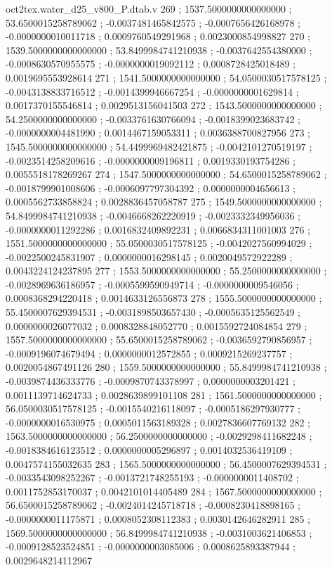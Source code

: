 \begin{filecontents}[overwrite]{oct2tex.water_d25_v800_P.dtab.v}
269 ; 1537.5000000000000000 ; 53.6500015258789062 ; -0.0037481465842575 ; -0.0007656426168978 ; -0.0000000010011718 ; 0.0009760549291968 ; 0.0023000854998827
270 ; 1539.5000000000000000 ; 53.8499984741210938 ; -0.0037642554380000 ; -0.0008630570955575 ; -0.0000000019092112 ; 0.0008728425018489 ; 0.0019695553928614
271 ; 1541.5000000000000000 ; 54.0500030517578125 ; -0.0043138833716512 ; -0.0014399946667254 ; -0.0000000001629814 ; 0.0017370155546814 ; 0.0029513156041503
272 ; 1543.5000000000000000 ; 54.2500000000000000 ; -0.0033761630766094 ; -0.0018399023683742 ; -0.0000000004481990 ; 0.0014467159053311 ; 0.0036388700827956
273 ; 1545.5000000000000000 ; 54.4499969482421875 ; -0.0042101270519197 ; -0.0023514258209616 ; -0.0000000009196811 ; 0.0019330193754286 ; 0.0055518178269267
274 ; 1547.5000000000000000 ; 54.6500015258789062 ; -0.0018799901008606 ; -0.0006097797304392 ; 0.0000000004656613 ; 0.0005562733858824 ; 0.0028836457058787
275 ; 1549.5000000000000000 ; 54.8499984741210938 ; -0.0046668262220919 ; -0.0023332349956036 ; -0.0000000011292286 ; 0.0016832409892231 ; 0.0066834311001003
276 ; 1551.5000000000000000 ; 55.0500030517578125 ; -0.0042027560994029 ; -0.0022500245831907 ; 0.0000000016298145 ; 0.0020049572922289 ; 0.0043224124237895
277 ; 1553.5000000000000000 ; 55.2500000000000000 ; -0.0028969636186957 ; -0.0005599590949714 ; -0.0000000009546056 ; 0.0008368294220418 ; 0.0014633126556873
278 ; 1555.5000000000000000 ; 55.4500007629394531 ; -0.0031898503657430 ; -0.0005635125562549 ; 0.0000000026077032 ; 0.0008328848052770 ; 0.0015592724084854
279 ; 1557.5000000000000000 ; 55.6500015258789062 ; -0.0036592790856957 ; -0.0009196074679494 ; 0.0000000012572855 ; 0.0009215269237757 ; 0.0020054867491126
280 ; 1559.5000000000000000 ; 55.8499984741210938 ; -0.0039874436333776 ; -0.0009870743378997 ; 0.0000000003201421 ; 0.0011139714624733 ; 0.0028639899101108
281 ; 1561.5000000000000000 ; 56.0500030517578125 ; -0.0015540216118097 ; -0.0005186297930777 ; -0.0000000016530975 ; 0.0005011563189328 ; 0.0027836607769132
282 ; 1563.5000000000000000 ; 56.2500000000000000 ; -0.0029298411682248 ; -0.0018384616123512 ; 0.0000000005296897 ; 0.0014032536419109 ; 0.0047574155032635
283 ; 1565.5000000000000000 ; 56.4500007629394531 ; -0.0033543098252267 ; -0.0013721748255193 ; -0.0000000011408702 ; 0.0011752853170037 ; 0.0042101014405489
284 ; 1567.5000000000000000 ; 56.6500015258789062 ; -0.0024014245718718 ; -0.0008230418898165 ; -0.0000000011175871 ; 0.0008052308112383 ; 0.0030142646282911
285 ; 1569.5000000000000000 ; 56.8499984741210938 ; -0.0031003621406853 ; -0.0009128523524851 ; -0.0000000003085006 ; 0.0008625893387944 ; 0.0029648214112967

\end{filecontents}
